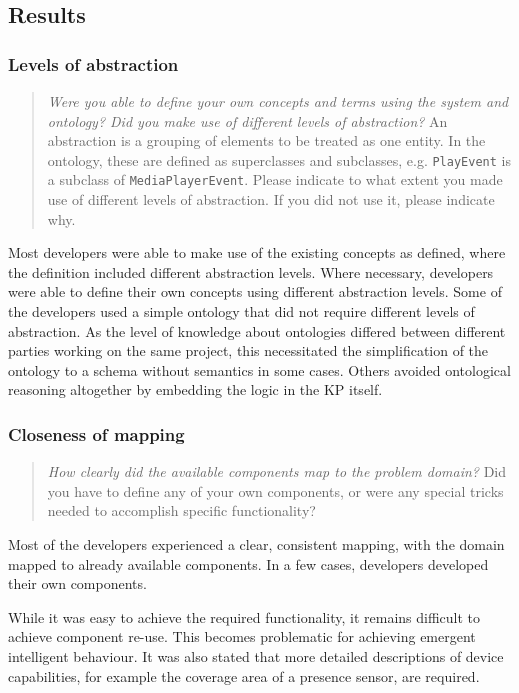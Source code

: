 \subsection{Results}


\subsubsection{Levels of abstraction}

\begin{quote}
	\emph{Were you able to define your own concepts and terms using the system and ontology? Did you make use of different levels of abstraction?} An abstraction is a grouping of elements to be treated as one entity. In the ontology, these are defined as superclasses and subclasses, e.g. \texttt{PlayEvent} is a subclass of \texttt{MediaPlayerEvent}. Please indicate to what extent you made use of different levels of abstraction. If you did not use it, please indicate why.
\end{quote}

Most developers were able to make use of the existing concepts as defined, where the definition included different abstraction levels. Where necessary, developers were able to define their own concepts using different abstraction levels. Some of the developers used a simple ontology that did not require different levels of abstraction. As the level of knowledge about ontologies differed between different parties working on the same project, this necessitated the simplification of the ontology to a schema without semantics in some cases. Others avoided ontological reasoning altogether by embedding the logic in the \ac{KP} itself.


\subsubsection{Closeness of mapping}
\label{resultsCloseness}

\begin{quote}
	\emph{How clearly did the available components map to the problem domain?}
	Did you have to define any of your own components, or were any special tricks needed to accomplish specific functionality?
\end{quote}


Most of the developers experienced a clear, consistent mapping, with the domain mapped to already available components. In a few cases, developers developed their own components.

While it was easy to achieve the required functionality, it remains difficult to achieve component re-use. This becomes problematic for achieving emergent intelligent behaviour. 
It was also stated that more detailed descriptions of device capabilities, for example the coverage area of a presence sensor, are required.



